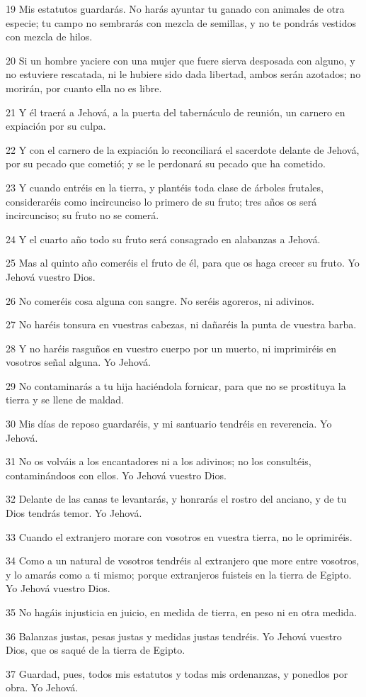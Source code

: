 \par 19 Mis estatutos guardarás. No harás ayuntar tu ganado con animales de otra especie; tu campo no sembrarás con mezcla de semillas, y no te pondrás vestidos con mezcla de hilos.
\par 20 Si un hombre yaciere con una mujer que fuere sierva desposada con alguno, y no estuviere rescatada, ni le hubiere sido dada libertad, ambos serán azotados; no morirán, por cuanto ella no es libre.
\par 21 Y él traerá a Jehová, a la puerta del tabernáculo de reunión, un carnero en expiación por su culpa.
\par 22 Y con el carnero de la expiación lo reconciliará el sacerdote delante de Jehová, por su pecado que cometió; y se le perdonará su pecado que ha cometido.
\par 23 Y cuando entréis en la tierra, y plantéis toda clase de árboles frutales, consideraréis como incircunciso lo primero de su fruto; tres años os será incircunciso; su fruto no se comerá.
\par 24 Y el cuarto año todo su fruto será consagrado en alabanzas a Jehová.
\par 25 Mas al quinto año comeréis el fruto de él, para que os haga crecer su fruto. Yo Jehová vuestro Dios.
\par 26 No comeréis cosa alguna con sangre. No seréis agoreros, ni adivinos.
\par 27 No haréis tonsura en vuestras cabezas, ni dañaréis la punta de vuestra barba.
\par 28 Y no haréis rasguños en vuestro cuerpo por un muerto, ni imprimiréis en vosotros señal alguna. Yo Jehová.
\par 29 No contaminarás a tu hija haciéndola fornicar,  para que no se prostituya la tierra y se llene de maldad.
\par 30 Mis días de reposo guardaréis, y mi santuario tendréis en reverencia. Yo Jehová.
\par 31 No os volváis a los encantadores ni a los adivinos; no los consultéis, contaminándoos con ellos. Yo Jehová vuestro Dios.
\par 32 Delante de las canas te levantarás, y honrarás el rostro del anciano, y de tu Dios tendrás temor. Yo Jehová.
\par 33 Cuando el extranjero morare con vosotros en vuestra tierra, no le oprimiréis.
\par 34 Como a un natural de vosotros tendréis al extranjero que more entre vosotros, y lo amarás como a ti mismo; porque extranjeros fuisteis en la tierra de Egipto. Yo Jehová vuestro Dios.
\par 35 No hagáis injusticia en juicio, en medida de tierra, en peso ni en otra medida.
\par 36 Balanzas justas, pesas justas y medidas justas tendréis. Yo Jehová vuestro Dios, que os saqué de la tierra de Egipto.
\par 37 Guardad, pues, todos mis estatutos y todas mis ordenanzas, y ponedlos por obra. Yo Jehová. 

